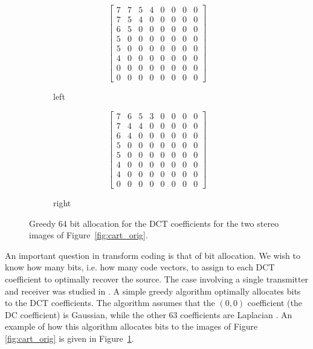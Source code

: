 \documentclass[10pt,twoside,titlepage]{article}
\begin{document}
\begin{figure}
    \begin{subfigure}{0.5\textwidth}
        \begin{equation*}
            \left[
            \begin{matrix}
                7 & 7 & 5 & 4 & 0 & 0 & 0 & 0 \\
                7 & 5 & 4 & 0 & 0 & 0 & 0 & 0 \\
                6 & 5 & 0 & 0 & 0 & 0 & 0 & 0 \\
                5 & 0 & 0 & 0 & 0 & 0 & 0 & 0 \\
                5 & 0 & 0 & 0 & 0 & 0 & 0 & 0 \\
                4 & 0 & 0 & 0 & 0 & 0 & 0 & 0 \\
                0 & 0 & 0 & 0 & 0 & 0 & 0 & 0 \\
                0 & 0 & 0 & 0 & 0 & 0 & 0 & 0
            \end{matrix}
            \right]
        \end{equation*}
    \caption{left}
    \end{subfigure}%
    \begin{subfigure}{0.5\textwidth}
        \begin{equation*}
            \left[
            \begin{matrix}
                7 & 6 & 5 & 3 & 0 & 0 & 0 & 0 \\
                7 & 4 & 4 & 0 & 0 & 0 & 0 & 0 \\
                6 & 4 & 0 & 0 & 0 & 0 & 0 & 0 \\
                5 & 0 & 0 & 0 & 0 & 0 & 0 & 0 \\
                5 & 0 & 0 & 0 & 0 & 0 & 0 & 0 \\
                4 & 0 & 0 & 0 & 0 & 0 & 0 & 0 \\
                4 & 0 & 0 & 0 & 0 & 0 & 0 & 0 \\
                0 & 0 & 0 & 0 & 0 & 0 & 0 & 0
            \end{matrix}
            \right]
        \end{equation*}
    \caption{right}
    \end{subfigure}
    \caption{Greedy 64 bit allocation for the DCT coefficients for the two stereo images of Figure~\ref{fig:cart_orig}. }
    \label{fig:cart_bit_alloc}
\end{figure}

An important question in transform coding is that of bit allocation. We wish to know how many bits, i.e. how many code vectors, to assign to each DCT coefficient to optimally recover the source. The case involving a single transmitter and receiver was studied in \cite{julien}. A simple greedy algorithm optimally allocates bits to the DCT coefficients. The algorithm assumes that the $(0,0)$ coefficient (the DC coefficient) is Gaussian, while the other 63 coefficients are Laplacian \cite{julien}. An example of how this algorithm allocates bits to the images of Figure \ref{fig:cart_orig} is given in Figure~\ref{fig:cart_bit_alloc}.
\end{document}
